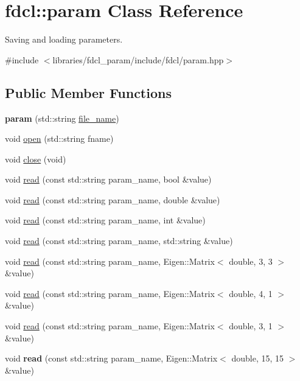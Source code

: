 \hypertarget{classfdcl_1_1param}{}\section{fdcl\+:\+:param Class Reference}
\label{classfdcl_1_1param}


Saving and loading parameters.  




{\ttfamily \#include $<$libraries/fdcl\+\_\+param/include/fdcl/param.\+hpp$>$}

\subsection*{Public Member Functions}
\begin{DoxyCompactItemize}
\item 
{\bfseries param} (std\+::string \hyperlink{classfdcl_1_1param_a1302a367e87eb43e7bd658c2b7214951}{file\+\_\+name})\hypertarget{classfdcl_1_1param_af2ca39bb3311626ca8a53a733cbf518a}{}\label{classfdcl_1_1param_af2ca39bb3311626ca8a53a733cbf518a}

\item 
void \hyperlink{classfdcl_1_1param_ab9349264aa4f308bae2fad53d8eb2da9}{open} (std\+::string fname)
\item 
void \hyperlink{classfdcl_1_1param_ade55d7b4e60c627733a141da2dfbb576}{close} (void)
\item 
void \hyperlink{classfdcl_1_1param_aef33b2f479d1491cad7fcb3869974330}{read} (const std\+::string param\+\_\+name, bool \&value)
\item 
void \hyperlink{classfdcl_1_1param_a1f02edda9f294ef0f729b12584813761}{read} (const std\+::string param\+\_\+name, double \&value)
\item 
void \hyperlink{classfdcl_1_1param_a6fcbcac3648df952482efdf6a908ad32}{read} (const std\+::string param\+\_\+name, int \&value)
\item 
void \hyperlink{classfdcl_1_1param_af5f11dddaeb85eb1cfbb4e8010b31c30}{read} (const std\+::string param\+\_\+name, std\+::string \&value)
\item 
void \hyperlink{classfdcl_1_1param_acb0fec516bec5d1d2a99bc5226ee2d11}{read} (const std\+::string param\+\_\+name, Eigen\+::\+Matrix$<$ double, 3, 3 $>$ \&value)
\item 
void \hyperlink{classfdcl_1_1param_aaba103b50f3ccc9902046dfcef82a047}{read} (const std\+::string param\+\_\+name, Eigen\+::\+Matrix$<$ double, 4, 1 $>$ \&value)
\item 
void \hyperlink{classfdcl_1_1param_ac244e6c80821f074ce7dad03ab45a39a}{read} (const std\+::string param\+\_\+name, Eigen\+::\+Matrix$<$ double, 3, 1 $>$ \&value)
\item 
void {\bfseries read} (const std\+::string param\+\_\+name, Eigen\+::\+Matrix$<$ double, 15, 15 $>$ \&value)\hypertarget{classfdcl_1_1param_aa77c3e92c9c3f1530a38460e66cae8b6}{}\label{classfdcl_1_1param_aa77c3e92c9c3f1530a38460e66cae8b6}


\end{DoxyCompactItemize}
